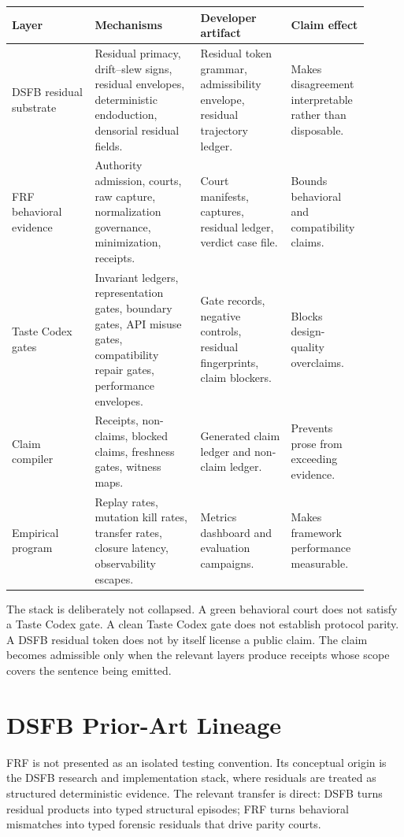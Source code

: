 \documentclass[11pt,a4paper]{article}
\newcommand{\frf}{\textsc{FRF}}
\newcommand{\dsfb}{\textsc{DSFB}}
\begin{document}
\begingroup
\small
\setlength{\tabcolsep}{3pt}
\begin{longtable}{>{\raggedright\arraybackslash}p{0.22\linewidth}>{\raggedright\arraybackslash}p{0.28\linewidth}>{\raggedright\arraybackslash}p{0.24\linewidth}>{\raggedright\arraybackslash}p{0.16\linewidth}}
\toprule
\textbf{Layer} & \textbf{Mechanisms} & \textbf{Developer artifact} & \textbf{Claim effect} \\
\midrule
\endhead
\dsfb{} residual substrate & Residual primacy, drift--slew signs, residual envelopes, deterministic endoduction, densorial residual fields. & Residual token grammar, admissibility envelope, residual trajectory ledger. & Makes disagreement interpretable rather than disposable. \\
\frf{} behavioral evidence & Authority admission, courts, raw capture, normalization governance, minimization, receipts. & Court manifests, captures, residual ledger, verdict case file. & Bounds behavioral and compatibility claims. \\
Taste Codex gates & Invariant ledgers, representation gates, boundary gates, API misuse gates, compatibility repair gates, performance envelopes. & Gate records, negative controls, residual fingerprints, claim blockers. & Blocks design-quality overclaims. \\
Claim compiler & Receipts, non-claims, blocked claims, freshness gates, witness maps. & Generated claim ledger and non-claim ledger. & Prevents prose from exceeding evidence. \\
Empirical program & Replay rates, mutation kill rates, transfer rates, closure latency, observability escapes. & Metrics dashboard and evaluation campaigns. & Makes framework performance measurable. \\
\bottomrule
\end{longtable}
\endgroup

The stack is deliberately not collapsed. A green behavioral court does not satisfy a Taste Codex gate. A clean Taste Codex gate does not establish protocol parity. A DSFB residual token does not by itself license a public claim. The claim becomes admissible only when the relevant layers produce receipts whose scope covers the sentence being emitted.

\section{DSFB Prior-Art Lineage}
\label{sec:dsfb-origin}

\frf{} is not presented as an isolated testing convention. Its conceptual origin is the \dsfb{} research and implementation stack, where residuals are treated as structured deterministic evidence. The relevant transfer is direct: \dsfb{} turns residual products into typed structural episodes; \frf{} turns behavioral mismatches into typed forensic residuals that drive parity courts.
\end{document}

